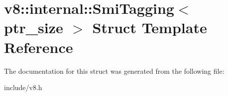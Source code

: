 \hypertarget{structv8_1_1internal_1_1_smi_tagging}{}\section{v8\+:\+:internal\+:\+:Smi\+Tagging$<$ ptr\+\_\+size $>$ Struct Template Reference}
\label{structv8_1_1internal_1_1_smi_tagging}


The documentation for this struct was generated from the following file\+:\begin{DoxyCompactItemize}
\item 
include/v8.\+h\end{DoxyCompactItemize}
